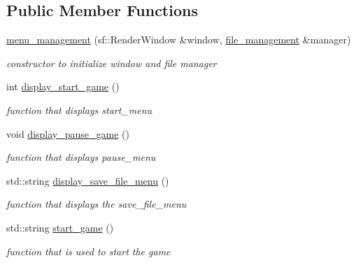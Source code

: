 \subsection*{Public Member Functions}
\begin{DoxyCompactItemize}
\item 
\hyperlink{classmenu__management_a5ad91bfa81593e0678c676e158126acd}{menu\+\_\+management} (sf\+::\+Render\+Window \&window, \hyperlink{classfile__management}{file\+\_\+management} \&manager)
\begin{DoxyCompactList}\small\item\em constructor to initialize window and file manager \end{DoxyCompactList}\item 
int \hyperlink{classmenu__management_aad6e975e03cab2478f3ebec8da7eaf7d}{display\+\_\+start\+\_\+game} ()
\begin{DoxyCompactList}\small\item\em function that displays start\+\_\+menu \end{DoxyCompactList}\item 
void \hyperlink{classmenu__management_ab7aa6674e3428604073af06efe5aa791}{display\+\_\+pause\+\_\+game} ()
\begin{DoxyCompactList}\small\item\em function that displays pause\+\_\+menu \end{DoxyCompactList}\item 
std\+::string \hyperlink{classmenu__management_ac64c1eace3d955be8623a1129597dc54}{display\+\_\+save\+\_\+file\+\_\+menu} ()
\begin{DoxyCompactList}\small\item\em function that displays the save\+\_\+file\+\_\+menu \end{DoxyCompactList}\item 
std\+::string \hyperlink{classmenu__management_a92d22f059d33ccc5c3ae485804fd5fbb}{start\+\_\+game} ()
\begin{DoxyCompactList}\small\item\em function that is used to start the game \end{DoxyCompactList}\end{DoxyCompactItemize}
